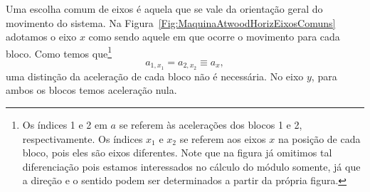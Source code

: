 Uma escolha comum de eixos é aquela que se vale da orientação geral do movimento do sistema. Na Figura~\ref{Fig:MaquinaAtwoodHorizEixosComuns} adotamos o eixo $x$ como sendo aquele em que ocorre o movimento para cada bloco. Como temos que\footnote[][-6cm]{Os índices 1 e 2 em $a$ se referem às acelerações dos blocos 1 e 2, respectivamente. Os índices $x_1$ e $x_2$ se referem aos eixos $x$ na posição de cada bloco, pois eles são eixos diferentes. Note que na figura já omitimos tal diferenciação pois estamos interessados no cálculo do módulo somente, já que a direção e o sentido podem ser determinados a partir da própria figura.} 
\begin{equation}
    a_{1,x_1} = a_{2,x_2} \equiv a_x,
\end{equation}
%
uma distinção da aceleração de cada bloco não é necessária. No eixo $y$, para ambos os blocos temos aceleração nula.


